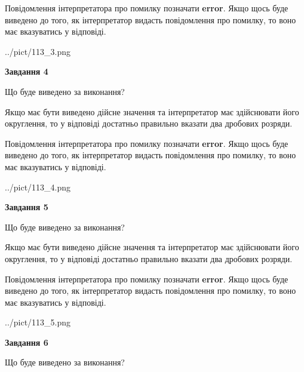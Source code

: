 \documentclass[12pt, ukrainian]{article}
\begin{document}
{\begin {Large}
Повідомлення інтерпретатора про помилку позначати \textbf{error}.
Якщо щось буде виведено до того, як інтерпретатор видасть повідомлення про помилку, 
то воно має вказуватись у відповіді. \par

\begin{center}
	{../pict/113_3.png}
\end{center}
\newpage

{\begin {center}\textbf{Завдання 4}\end {center}}\par
Що буде виведено за виконання? \par

Якщо має бути виведено дійсне значення та інтерпретатор має здійснювати його округлення, 
то у відповіді достатньо правильно вказати два дробових розряди.

Повідомлення інтерпретатора про помилку позначати \textbf{error}.
Якщо щось буде виведено до того, як інтерпретатор видасть повідомлення про помилку, 
то воно має вказуватись у відповіді. \par

\begin{center}
	{../pict/113_4.png}
\end{center}
\newpage

{\begin {center}\textbf{Завдання 5}\end {center}}\par
Що буде виведено за виконання? \par

Якщо має бути виведено дійсне значення та інтерпретатор має здійснювати його округлення, 
то у відповіді достатньо правильно вказати два дробових розряди.

Повідомлення інтерпретатора про помилку позначати \textbf{error}.
Якщо щось буде виведено до того, як інтерпретатор видасть повідомлення про помилку, 
то воно має вказуватись у відповіді. \par

\begin{center}
	{../pict/113_5.png}
\end{center}
\newpage

{\begin {center}\textbf{Завдання 6}\end {center}}\par
Що буде виведено за виконання? \par


\end{Large}}
\end{document}
